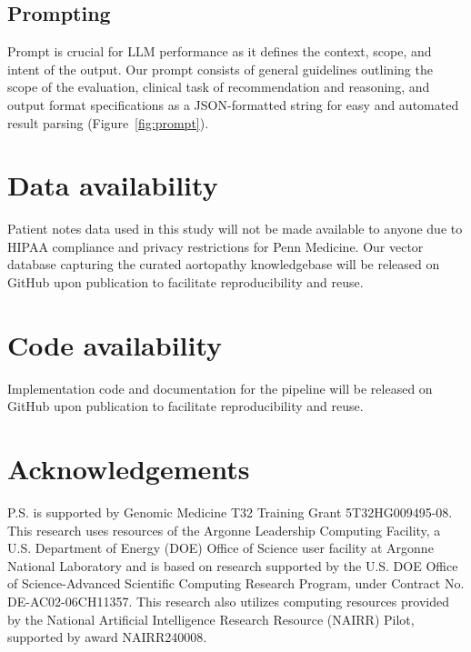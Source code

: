 \documentclass[fleqn,10pt]{wlscirep}
\begin{document}
\subsection*{Prompting}


Prompt is crucial for LLM performance as it defines the context, scope, and intent of the output. Our prompt consists of general guidelines outlining the scope of the evaluation,  clinical task of recommendation and reasoning, and output format specifications as a JSON-formatted string for easy and automated result parsing (Figure~\ref{fig:prompt}). 



\section*{Data availability}
Patient notes data used in this study will not be made available to anyone due to HIPAA compliance and privacy restrictions for Penn Medicine. Our vector database capturing the curated aortopathy knowledgebase will be released on GitHub upon publication to facilitate reproducibility and reuse.

\section*{Code availability}
Implementation code and documentation for the pipeline will be released on GitHub upon publication to facilitate reproducibility and reuse.




\section*{Acknowledgements}

P.S. is supported by Genomic Medicine T32 Training Grant 5T32HG009495-08. This research uses resources of the Argonne Leadership Computing Facility, a U.S. Department of Energy (DOE) Office of Science user facility at Argonne National Laboratory and is based on research supported by the U.S. DOE Office of Science-Advanced Scientific Computing Research Program, under Contract No. DE-AC02-06CH11357. This research also utilizes computing resources provided by the National Artificial Intelligence Research Resource (NAIRR) Pilot, supported by award NAIRR240008.
\end{document}
